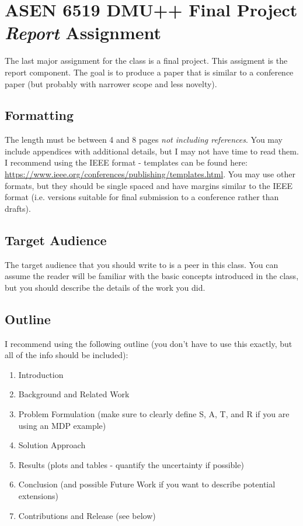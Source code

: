\documentclass{article}
\begin{document}
\section*{ASEN 6519 DMU++ Final Project \emph{Report} Assignment}

The last major assignment for the class is a final project. This assigment is the report component. The goal is to produce a paper that is similar to a conference paper (but probably with narrower scope and less novelty).

\subsection*{Formatting}

The length must be between 4 and 8 pages \emph{not including references}. You may include appendices with additional details, but I may not have time to read them. I recommend using the IEEE format - templates can be found here: \url{https://www.ieee.org/conferences/publishing/templates.html}. You may use other formats, but they should be single spaced and have margins similar to the IEEE format (i.e. versions suitable for final submission to a conference rather than drafts).

\subsection*{Target Audience}

The target audience that you should write to is a peer in this class. You can assume the reader will be familiar with the basic concepts introduced in the class, but you should describe the details of the work you did.

\subsection*{Outline}

I recommend using the following outline (you don't have to use this exactly, but all of the info should be included):

\begin{enumerate}[nosep]
    \item Introduction
    \item Background and Related Work
    \item Problem Formulation (make sure to clearly define S, A, T, and R if you are using an MDP example)
    \item Solution Approach
    \item Results (plots and tables - quantify the uncertainty if possible)
    \item Conclusion (and possible Future Work if you want to describe potential extensions)
    \item Contributions and Release (see below)
\end{enumerate}
\end{document}
